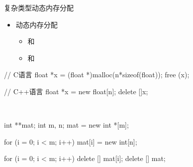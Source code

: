 \begin{frame}[fragile]{复杂类型}{动态内存分配}
  \begin{itemize}
  \item 动态内存分配    
    \begin{itemize}
    \item {}和
    \item {}和
    \end{itemize}  
  \end{itemize}
  \begin{center}
    \begin{minipage}{0.55\linewidth}
      \begin{cppcode}
// C语言
float *x = (float *)malloc(n*sizeof(float));
free (x);

// C++语言
float *x = new float[n];
delete []x;
      \end{cppcode}
    \end{minipage}\\%
    \begin{minipage}{0.35\linewidth}
      \begin{cppcode}
int **mat;
int m, n;
mat = new int *[m];

for (i = 0; i < m; i++)
    mat[i] = new int[n];

for (i = 0; i < m; i++)
    delete [] mat[i];
delete [] mat;
      \end{cppcode}
    \end{minipage}
  \end{center}
\end{frame}
